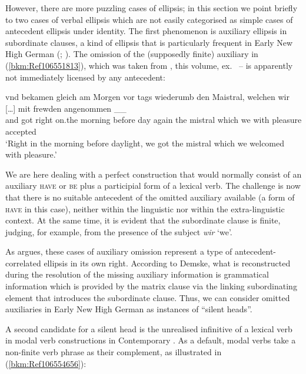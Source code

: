 \documentclass[output=paper
  ,nobabel
  ,draftmode
  ,colorlinks, citecolor=brown
]{langscibook}
\begin{document}
However, there are more puzzling cases of ellipsis; in this section we point briefly to two cases of
verbal ellipsis which are not easily categorised as simple cases of antecedent ellipsis under
identity. The first phenomenon is auxiliary ellipsis in subordinate clauses, a kind of ellipsis that
is particularly frequent in Early New High German (\citealt{demske90};
\citealt{Breitbarth2005}). The omission of the (supposedly finite) auxiliary in
(\ref{bkm:Ref106551813}), which was taken from \citealt[\pageref{ex-Mistral}]{chapters/demske}, this volume, ex.\
 -- is apparently not immediately licensed by any antecedent:

\ea
\label{bkm:Ref106551813}%
\gll   vnd  bekamen gleich am     Morgen  vor    tags wiederumb den Maistral, welchen wir [\ldots] mit  frewden  angenommen  \_\_\\
       and  got     right  on.the morning before day  again     the mistral   which   we  {}       with pleasure accepted\\
\glt   `Right in the morning before daylight, we got the mistral which we welcomed with pleasure.'
\z

\noindent
We are here dealing with a perfect construction that would normally consist of an auxiliary
\textsc{have} or \textsc{be} plus a participial form of a lexical verb. The challenge is now that
there is no suitable antecedent of the omitted auxiliary available (a form of \textsc{have} in this
case), neither within the linguistic nor within the extra-linguistic context. At the same time, it
is evident that the subordinate clause is finite, judging, for example, from the presence of the
subject \emph{wir} `we'.

As \citet{chapters/demske} argues, these cases of auxiliary omission represent a type of
antecedent-correlated ellipsis in its own right. According to Demske, what is reconstructed during
the resolution of the missing auxiliary information is grammatical information which is provided by
the matrix clause via the linking subordinating element that introduces the subordinate
clause. Thus, we can consider omitted auxiliaries in Early New High German as instances of ``silent
heads''.

A second candidate for a silent head is the unrealised infinitive of a lexical verb in modal verb
constructions in Contemporary \ili{German}. As a default, modal verbs take a non-finite verb phrase as
their complement, as illustrated in (\ref{bkm:Ref106554656}):
\end{document}
